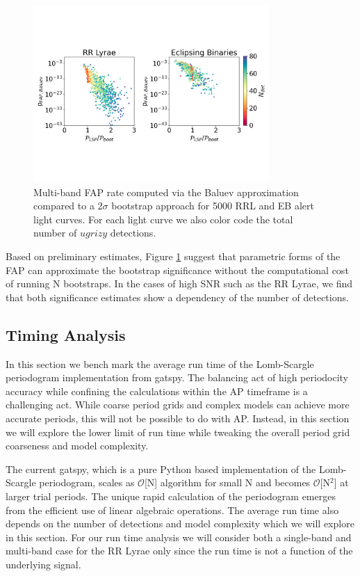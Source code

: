 \documentclass[DM,authoryear,toc]{lsstdoc}
\begin{document}
\begin{figure}
  \includegraphics[width=0.8\textwidth]{figures/fap_approximation_mlsp.pdf}
  \centering 
  \caption{Multi-band FAP rate computed via the Baluev approximation compared to a $2\sigma$ bootstrap approach for 5000 RRL and EB alert light curves. For each light curve we also color code the total number of $ugrizy$ detections.}
  \label{fig:boot}
\end{figure}

Based on preliminary estimates, Figure \ref{fig:boot} suggest that parametric forms of the FAP can approximate the bootstrap significance without the computational cost of running N bootstraps. In the cases of high SNR such as the RR Lyrae, we find that both significance estimates show a dependency of the number of detections. 

\subsection{Timing Analysis}

In this section we bench mark the average run time of the Lomb-Scargle periodogram implementation from gatspy. The balancing act of high periodocity accuracy while confining the calculations within the AP timeframe is a challenging act. While coarse period grids  and complex models can achieve more accurate periods, this will not be possible to do with AP. Instead, in this section we will explore the lower limit of run time while tweaking the overall period grid coarseness and model complexity.

The current gatspy, which is a pure Python based implementation of the Lomb-Scargle periodogram, scales as  $\mathcal{O}$[N] algorithm for small N and becomes $\mathcal{O}$[N$^2$] at larger trial periods. The unique rapid calculation of the periodogram emerges from the efficient use of linear algebraic operations. The average run time also depends on the number of detections and model complexity which we will explore in this section. For our run time analysis we will consider both a single-band and multi-band case for the RR Lyrae only since the run time is not a function of the underlying signal. 
\end{document}
